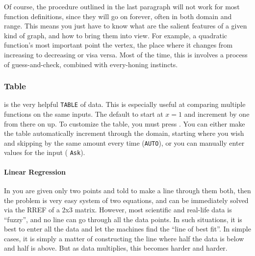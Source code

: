 Of course, the procedure outlined in the last paragraph will not work for most function definitions,
since they will go on forever, often in both domain and range.  This means you just have to know
what are the salient features of a given kind of graph, and how to bring them into view.  For example,
a quadratic function's most important point the vertex, the place where it changes from increasing
to decreasing or visa versa.  Most of the time, this is involves a process of guess-and-check,
combined with every-honing instincts.

\subsubsection{Table}
\Touche[style=second] \Touche[style=graph,principal={graph},position=0.9,fontsize=7pt,raise=-5pt] is
the very helpful \texttt{TABLE} of data.  This is especially useful at comparing multiple functions on 
the same inputs.  The default to start at $x=1$ and increment by one from there on up.
To customize the table, you must press \Touche[style=second] 
\Touche[style=graph,principal=window,position=0.9,fontsize=7pt,second=tblset,raise=-10pt].  
You can either make the table 
automatically increment through the domain, starting where you wish and skipping by the
same amount every time (\texttt{AUTO}), or you can manually enter values for the input (
\texttt{Ask}).


\paragraph{Linear Regression}
In you are given only two points and told to make a line through them both, then the problem is 
very easy system of two equations, and can be immediately solved via the RREF of a 2x3 matrix.
However, most scientific and real-life data is ``fuzzy'', and no line can go through all the data points.
In such situations, it is best to enter all the data and let the machines find the ``line of best fit''.  In 
simple cases, it is simply a matter of constructing the line where half the data is below and half is 
above.  But as data multiplies, this becomes harder and harder.

